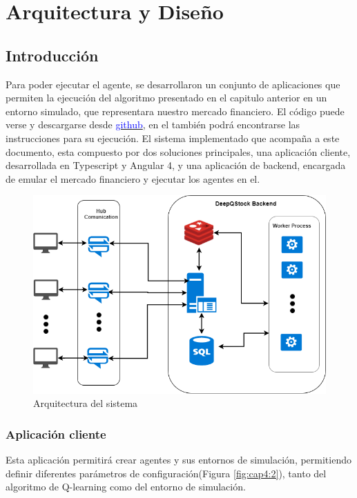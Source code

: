 \chapter{Arquitectura y Diseño}


\section{Introducción}

Para poder ejecutar el agente, se desarrollaron un conjunto de aplicaciones que permiten la ejecución del algoritmo presentado en el capitulo anterior en un entorno simulado, que representara nuestro mercado financiero.
El código puede verse y descargarse desde \href{https://github.com/jcaramello/deepQ-stock}{\textcolor{blue}{github}}, en el también podrá encontrarse las instrucciones para su ejecución. El sistema implementado que acompaña a este documento, esta compuesto por dos soluciones principales, una aplicación cliente, desarrollada en Typescript y Angular 4, y una aplicación de backend, 
encargada de emular el mercado financiero y ejecutar los agentes en el.

\begin{figure}[h!]
	\includegraphics[scale=0.5]{imagenes/deepQStockArchitectureOverview.png}
	\caption{Arquitectura del sistema}
	\label{fig:cap4:1}
\end{figure}

\subsection{Aplicación cliente}
Esta aplicación permitirá crear agentes y sus entornos de simulación, permitiendo definir diferentes parámetros de configuración(Figura \ref{fig:cap4:2}), tanto del algoritmo de Q-learning como del entorno de simulación.\\ 

